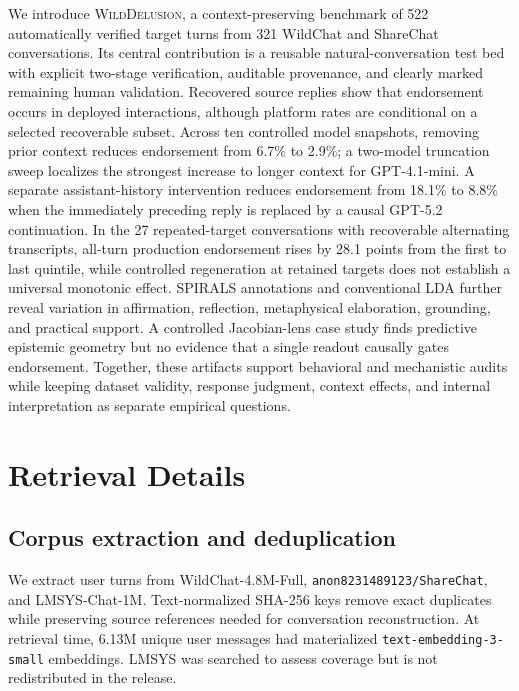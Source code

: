 \documentclass{article}
\newcommand{\dataset}{\textsc{WildDelusion}}
\begin{document}
We introduce \dataset{}, a context-preserving benchmark of 522 automatically verified target turns from 321 WildChat and ShareChat conversations. Its central contribution is a reusable natural-conversation test bed with explicit two-stage verification, auditable provenance, and clearly marked remaining human validation. Recovered source replies show that endorsement occurs in deployed interactions, although platform rates are conditional on a selected recoverable subset. Across ten controlled model snapshots, removing prior context reduces endorsement from 6.7\% to 2.9\%; a two-model truncation sweep localizes the strongest increase to longer context for GPT-4.1-mini. A separate assistant-history intervention reduces endorsement from 18.1\% to 8.8\% when the immediately preceding reply is replaced by a causal GPT-5.2 continuation. In the 27 repeated-target conversations with recoverable alternating transcripts, all-turn production endorsement rises by 28.1 points from the first to last quintile, while controlled regeneration at retained targets does not establish a universal monotonic effect. SPIRALS annotations and conventional LDA further reveal variation in affirmation, reflection, metaphysical elaboration, grounding, and practical support. A controlled Jacobian-lens case study finds predictive epistemic geometry but no evidence that a single readout causally gates endorsement. Together, these artifacts support behavioral and mechanistic audits while keeping dataset validity, response judgment, context effects, and internal interpretation as separate empirical questions.




\appendix

\section{Retrieval Details}
\label{app:retrieval}

\subsection{Corpus extraction and deduplication}

We extract user turns from WildChat-4.8M-Full, \texttt{anon8231489123/ShareChat}, and LMSYS-Chat-1M. Text-normalized SHA-256 keys remove exact duplicates while preserving source references needed for conversation reconstruction. At retrieval time, 6.13M unique user messages had materialized \texttt{text-embedding-3-small} embeddings. LMSYS was searched to assess coverage but is not redistributed in the release.
\end{document}
